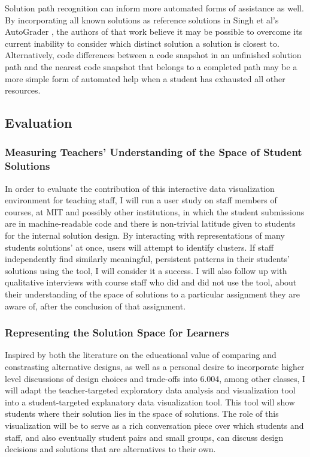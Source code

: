 \documentclass[12pt]{article}
\begin{document}

Solution path recognition can inform more automated forms of assistance as well. By incorporating all known solutions as reference solutions in Singh et al's AutoGrader \cite{rishabh}, the authors of that work believe it may be possible to overcome its current inability to consider which distinct solution a solution is closest to. Alternatively, code differences between a code snapshot in an unfinished solution path and the nearest code snapshot that belongs to a completed path may be a more simple form of automated help when a student has exhausted all other resources. %

\subsection{Evaluation}

\subsubsection{Measuring Teachers' Understanding of the Space of Student Solutions}

In order to evaluate the contribution of this interactive data visualization environment for teaching staff, I will run a user study on staff members of courses, at MIT and possibly other institutions, in which the student submissions are in machine-readable code and there is non-trivial latitude given to students for the internal solution design. By interacting with representations of many students solutions' at once, users will attempt to identify clusters. If staff independently find similarly meaningful, persistent patterns in their students' solutions using the tool, I will consider it a success. I will also follow up with qualitative interviews with course staff who did and did not use the tool, about their understanding of the space of solutions to a particular assignment they are aware of, after the conclusion of that assignment.

\subsubsection{Representing the Solution Space for Learners}

Inspired by both the literature on the educational value of comparing and constrasting alternative designs, as well as a personal desire to incorporate higher level discussions of design choices and trade-offs into 6.004, among other classes, I will adapt the teacher-targeted exploratory data analysis and visualization tool into a student-targeted explanatory data visualization tool. This tool will show students where their solution lies in the space of solutions. The role of this visualization will be to serve as a rich conversation piece over which students and staff, and also eventually student pairs and small groups, can discuss design decisions and solutions that are alternatives to their own. 
\end{document}
